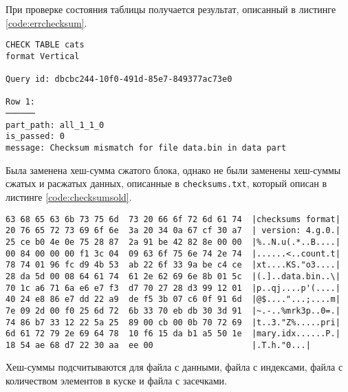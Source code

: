 При проверке состояния таблицы получается результат, описанный в листинге \ref{code:errchecksum}.

\begin{lstlisting}[label=code:errchecksum, caption={Результат проверки.}]
CHECK TABLE cats
format Vertical

Query id: dbcbc244-10f0-491d-85e7-849377ac73e0

Row 1:
──────
part_path: all_1_1_0
is_passed: 0
message: Checksum mismatch for file data.bin in data part
\end{lstlisting}

Была заменена хеш-сумма сжатого блока, однако не были заменены хеш-суммы сжатых и расжатых данных, описанные в \texttt{checksums.txt}, который описан в листинге \ref{code:checksumsold}.

\begin{lstlisting}[label=code:checksumsold, caption={Хеш-суммы, описанные в файле \texttt{checksums.txt}.}]
63 68 65 63 6b 73 75 6d  73 20 66 6f 72 6d 61 74  |checksums format|
20 76 65 72 73 69 6f 6e  3a 20 34 0a 67 cf 30 a7  | version: 4.g.0.|
25 ce b0 4e 0e 75 28 87  2a 91 be 42 82 8e 00 00  |%..N.u(.*..B....|
00 84 00 00 00 f1 3c 04  09 63 6f 75 6e 74 2e 74  |......<..count.t|
78 74 01 96 fc d9 4b 53  ab 22 6f 33 9a be c4 ce  |xt....KS."o3....|
28 da 5d 00 08 64 61 74  61 2e 62 69 6e 8b 01 5c  |(.]..data.bin..\|
70 1c a6 71 6a e6 e7 f3  d7 70 27 28 d3 99 12 01  |p..qj....p'(....|
40 24 e8 86 e7 dd 22 a9  de f5 3b 07 c6 0f 91 6d  |@$...."...;....m|
7e 09 2d 00 f0 25 6d 72  6b 33 70 eb db 30 3d 91  |~.-..%mrk3p..0=.|
74 86 b7 33 12 22 5a 25  89 00 cb 00 0b 70 72 69  |t..3."Z%.....pri|
6d 61 72 79 2e 69 64 78  10 f6 15 da b1 a5 50 1e  |mary.idx......P.|
18 54 ae 68 d7 22 30 aa  ee 00                    |.T.h."0...|
\end{lstlisting}

Хеш-суммы подсчитываются для файла с данными, файла с индексами, файла с количеством элементов в куске и файла с засечками.


